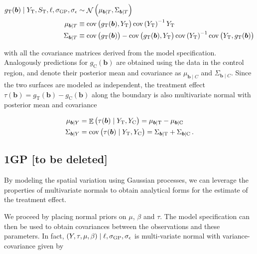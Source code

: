 \documentclass[letter]{article}
\DeclareMathOperator{\E}{\mathbb{E}}
\DeclareMathOperator{\cov}{{cov}}
\DeclareMathOperator{\normal}{\mathcal{N}}
\newcommand{\treat}{\mathrm{T}}
\newcommand{\ctrol}{\mathrm{C}}
\newcommand{\sigmaf}{\sigma_{\mathrm{GP}}}
\newcommand{\sigman}{\sigma_{\epsilon}}
\newcommand{\sentinels}{\bm{b}}
\newcommand{\eqlabel}[1]{\label{#1}}
\begin{document}
\begin{equation}\begin{split}
    g_\treat{}(\sentinels) \mid Y_\treat{}, S_\treat{}, \ell, \sigmaf, \sigman &\sim \normal\del{\mu_{\sentinels \mid T}, \Sigma_{\sentinels \mid T}} \\
    \mu_{\sentinels \mid T} &\equiv \cov\del{g_\treat{}(\sentinels), Y_\treat{}} \cov\del{Y_\treat{}}^{-1}  Y_\treat{} \\
    \Sigma_{\sentinels \mid T} &\equiv \cov \del{g_\treat{}(\sentinels)} - \cov\del{g_\treat{}(\sentinels), Y_\treat{}} \cov\del{Y_\treat{}}^{-1} \cov\del{Y_\treat{},g_\treat{}(\sentinels)
    }
\end{split}
 \label{eq:postvar2gp_t_or_c}
\end{equation}

with all the covariance matrices derived from the model specification.
Analogously predictions for \(g_\ctrol{}(\sentinels)\) are obtained using the data in the control region, and denote their posterior mean and covariance as \(\mu_{\sentinels \mid C}\) and \(\Sigma_{\sentinels \mid C}\). Since the two surfaces are modeled as independent, the treatment effect \(\tau(\sentinels)=g_\treat{}(\sentinels)-g_\ctrol{}(\sentinels)\) along the boundary is also multivariate normal with posterior mean and covariance

\begin{equation}
\begin{split}
    \mu_{\sentinels \mid Y} &= \E \del{\tau(\sentinels) \mid Y_\treat{}, Y_\ctrol{}} = \mu_{\sentinels \mid \treat} - \mu_{\sentinels \mid \ctrol} \\
    \Sigma_{\sentinels \mid Y} &= \cov\del{\tau(\sentinels) \mid Y_\treat{}, Y_\ctrol{}} = \Sigma_{\sentinels \mid \treat} + \Sigma_{\sentinels \mid \ctrol}\,.
\end{split}
\eqlabel{eq:postvar2gp}
\end{equation}
    


    	\subsection{1GP {[}to be deleted{]}}\label{gp-to-be-deleted}

By modeling the spatial variation using Gaussian processes, we can leverage the properties of multivariate normals to obtain analytical forms for the estimate of the treatment effect.

We proceed by placing normal priors on \(\mu\), \(\beta\) and \(\tau\). The model specification can then be used to obtain covariances between the observations and these parameters. In fact, \(\del{Y,\tau,\mu,\beta} \mid \ell,\sigmaf, \sigman\) is multi-variate normal with variance-covariance given by
\end{document}

